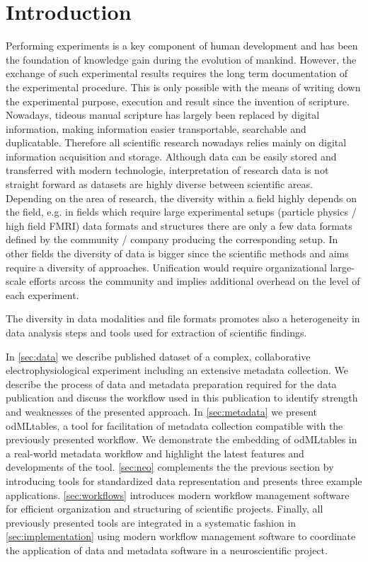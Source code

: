 \clearpage
\section{Introduction}
\label{sec:intro}

Performing experiments is a key component of human development and has been the foundation of knowledge gain during the evolution of mankind. However, the exchange of such experimental results requires the long term documentation of the  experimental procedure. This is only possible with the means of writing down the experimental purpose, execution and result since the invention of scripture. Nowadays, tideous manual scripture has largely been replaced by digital information, making information easier transportable, searchable and duplicatable. Therefore all scientific research nowadays relies mainly on digital information acquisition and storage. Although data can be easily stored and transferred with modern technologie, interpretation of research data is not straight forward as datasets are highly diverse between scientific areas. Depending on the area of research, the diversity within a field highly depends on the field, e.g. in fields which require large experimental setups (particle physics / high field FMRI) data formats and structures  there are only a few data formats defined by the community / company producing the corresponding setup. In other fields the diversity of data is bigger since the scientific methods and aims require a diversity of approaches. Unification would require organizational large-scale efforts arcoss the community and implies additional overhead on the level of each experiment.

The diversity in data modalities and file formats promotes also a heterogeneity in data analysis steps and tools used for extraction of scientific findings.




In \cref{sec:data} we describe published dataset of a complex, collaborative electrophysiological experiment including an extensive metadata collection. We describe the process of data and metadata preparation required for the data publication and discuss the workflow used in this publication to identify strength and weaknesses of the presented approach. In \cref{sec:metadata} we present odMLtables, a tool for facilitation of metadata collection compatible with the previously presented workflow. We demonstrate the embedding of odMLtables in a real-world metadata workflow and highlight the latest features and developments of the tool. \cref{sec:neo} complements the the previous section by introducing tools for standardized data representation and presents three example applications. \cref{sec:workflows} introduces modern workflow management software for efficient organization and structuring of scientific projects. Finally, all previously presented tools are integrated in a systematic fashion in \cref{sec:implementation} using modern workflow management software to coordinate the application of data and metadata software in a neuroscientific project.
